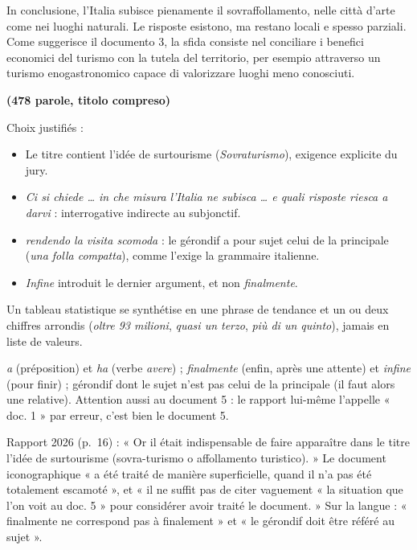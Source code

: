 \documentclass[11pt,a4paper]{article}
\providecommand{\tightlist}{\setlength{\itemsep}{0pt}\setlength{\parskip}{0pt}}
\begin{document}
In conclusione, l'Italia subisce pienamente il sovraffollamento, nelle città d'arte come nei luoghi naturali. Le risposte esistono, ma restano locali e spesso parziali. Come suggerisce il documento 3, la sfida consiste nel conciliare i benefici economici del turismo con la tutela del territorio, per esempio attraverso un turismo enogastronomico capace di valorizzare luoghi meno conosciuti.

\textbf{(478 parole, titolo compreso)}

Choix justifiés :

\begin{itemize}
\tightlist
\item
  Le titre contient l'idée de surtourisme (\emph{Sovraturismo}), exigence explicite du jury.
\item
  \emph{Ci si chiede \ldots{} in che misura l'Italia ne subisca \ldots{} e quali risposte riesca a darvi} : interrogative indirecte au subjonctif.
\item
  \emph{rendendo la visita scomoda} : le gérondif a pour sujet celui de la principale (\emph{una folla compatta}), comme l'exige la grammaire italienne.
\item
  \emph{Infine} introduit le dernier argument, et non \emph{finalmente}.
\end{itemize}

\begin{methode}

Un tableau statistique se synthétise en une phrase de tendance et un ou deux chiffres arrondis (\emph{oltre 93 milioni}, \emph{quasi un terzo}, \emph{più di un quinto}), jamais en liste de valeurs.

\end{methode}

\begin{piege}

\emph{a} (préposition) et \emph{ha} (verbe \emph{avere}) ; \emph{finalmente} (enfin, après une attente) et \emph{infine} (pour finir) ; gérondif dont le sujet n'est pas celui de la principale (il faut alors une relative). Attention aussi au document 5 : le rapport lui-même l'appelle « doc. 1 » par erreur, c'est bien le document 5.

\end{piege}

\begin{jury}

Rapport 2026 (p.~16) : « Or il était indispensable de faire apparaître dans le titre l'idée de surtourisme (sovra-turismo o affollamento turistico). » Le document iconographique « a été traité de manière superficielle, quand il n'a pas été totalement escamoté », et « il ne suffit pas de citer vaguement « la situation que l'on voit au doc. 5 » pour considérer avoir traité le document. » Sur la langue : « finalmente ne correspond pas à finalement » et « le gérondif doit être référé au sujet ».

\end{jury}
\end{document}
